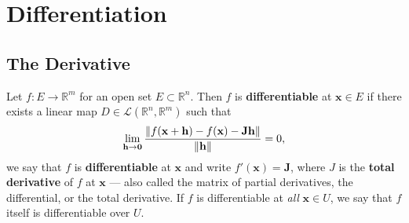 \documentclass[11pt]{article}
\renewcommand{\vec}[1]{\mathbf{#1}}
\newcommand{\mat}[1]{\mathbf{#1}}
\begin{document}


\section{Differentiation}


\subsection{The Derivative}

Let $f : E \to \mathbb{R}^{m}$ for an open set $E \subset \mathbb{R}^{n}$. Then $f$ is \textbf{differentiable} at $\vec{x} \in E$ if there exists a linear map $D \in \mathcal{L}(\mathbb{R}^{n}, \mathbb{R}^{m})$ such that
\[
	\lim\limits_{\vec{h} \to \vec{0}} \frac{\norm{f(\vec{x} + \vec{h}) - f(\vec{x}) - \mat{J}\vec{h}}}{\norm{\vec{h}}} = 0,
\] 
we say that $f$ is \textbf{differentiable} at $\vec{x}$ and write $f'(\vec{x}) = \mat{J}$, where $J$ is the \textbf{total derivative} of $f$ at $\vec{x}$ --- also called the matrix of partial derivatives, the differential, or the total derivative. If $f$ is differentiable at \textit{all} $\vec{x} \in U$, we say that $f$ itself is differentiable over $U$.
\end{document}
